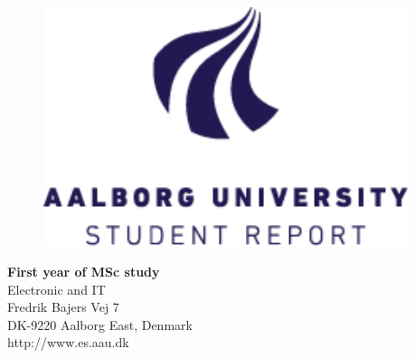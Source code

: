 {}
\thispagestyle{empty}

\begin{minipage}[t]{0.48\textwidth}
\vspace*{-25pt}			%

\begin{figure}[H] 
\includegraphics[width=0.95\textwidth]{report/introduction/aau_logo1}
\end{figure} 
\end{minipage}
\hfill
\begin{minipage}[t]{0.48\textwidth}
{\small 
\textbf{First year of MSc study}  \\
Electronic and IT \\
Fredrik Bajers Vej 7 \\
DK-9220 Aalborg East, Denmark\\
http://www.es.aau.dk}
\end{minipage}


\vspace*{1cm}

